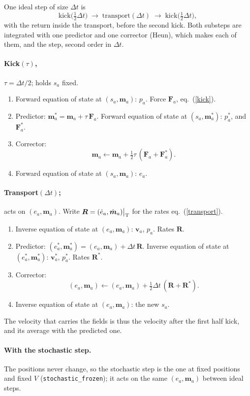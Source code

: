 \documentclass[11pt,aps,preprint,nofootinbib,superscriptaddress,tightenlines]{revtex4-2}
\def\st{\begin{equation}}
\def\stp{\end{equation}}
\def\Eq#1{eq.~(\ref{#1})}
\let\oldparagraph\paragraph
\renewcommand{\paragraph}{\par\bigskip\oldparagraph}
\begin{document}
One ideal step of size $\Delta t$ is
\st
\text{kick}\big(\tfrac12\Delta t\big)\;\to\;\text{transport}(\Delta t)\;\to\;
\text{kick}\big(\tfrac12\Delta t\big) ,
\stp
with the return inside the transport, before the second kick.  Both substeps are
integrated with one predictor and one corrector (Heun), which makes each of them, and
the step, second order in $\Delta t$.

\paragraph{Kick$(\tau)$,} $\tau=\Delta t/2$; holds $s_a$ fixed.
\begin{enumerate}
\item Forward equation of state at $(s_a,\bm m_a)$: $p_a$.  Force $\bm F_a$, \Eq{kick}.
\item Predictor: $\bm m_a^*=\bm m_a+\tau\,\bm F_a$.  Forward equation of state at
  $(s_a,\bm m_a^*)$: $p_a^*$, and $\bm F_a^*$.
\item Corrector:
  \st
  \bm m_a\leftarrow\bm m_a+\tfrac12\tau\,(\bm F_a+\bm F_a^*) .
  \stp
\item Forward equation of state at $(s_a,\bm m_a)$: $e_a$.
\end{enumerate}

\paragraph{Transport$(\Delta t)$;} acts on $(e_a,\bm m_a)$.  Write
$\bm R=(\dot e_a,\dot{\bm m}_a)\big|_{\rm T}$ for the rates \Eq{transport}.
\begin{enumerate}
\item Inverse equation of state at $(e_a,\bm m_a)$: $\bm v_a$, $p_a$.  Rates $\bm R$.
\item Predictor: $(e_a^*,\bm m_a^*)=(e_a,\bm m_a)+\Delta t\,\bm R$.  Inverse equation of
  state at $(e_a^*,\bm m_a^*)$: $\bm v_a^*$, $p_a^*$.  Rates $\bm R^*$.
\item Corrector:
  \st
  (e_a,\bm m_a)\leftarrow(e_a,\bm m_a)+\tfrac12\Delta t\,(\bm R+\bm R^*) .
  \stp
\item Inverse equation of state at $(e_a,\bm m_a)$: the new $s_a$.
\end{enumerate}
The velocity that carries the fields is thus the velocity after the first half kick,
and its average with the predicted one.

\paragraph{With the stochastic step.}  The positions never change, so the stochastic
step is the one at fixed positions and fixed $V$ (\texttt{stochastic\_frozen}); it
acts on the same $(e_a,\bm m_a)$ between ideal steps.
\end{document}
